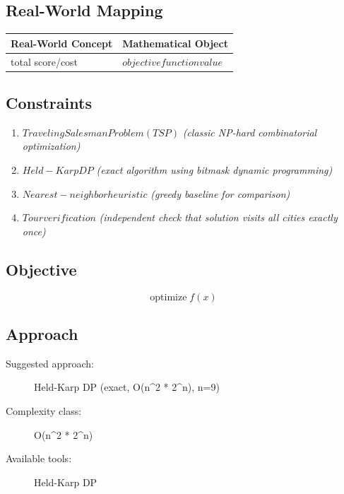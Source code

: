 \documentclass[11pt, a4paper]{article}
\begin{document}
\subsection{Real-World Mapping}

\begin{longtable}{ll}
\toprule
\textbf{Real-World Concept} & \textbf{Mathematical Object} \\
\midrule
\endhead
total score/cost & $objective function value$ \\
\bottomrule
\end{longtable}

\subsection{Constraints}

\begin{enumerate}
  \item $Traveling Salesman Problem (TSP)$
  \hfill \textit{(classic NP-hard combinatorial optimization)}
  \item $Held-Karp DP$
  \hfill \textit{(exact algorithm using bitmask dynamic programming)}
  \item $Nearest-neighbor heuristic$
  \hfill \textit{(greedy baseline for comparison)}
  \item $Tour verification$
  \hfill \textit{(independent check that solution visits all cities exactly once)}
\end{enumerate}

\subsection{Objective}

\begin{equation}
\text{optimize} \; f(x)
\end{equation}

\subsection{Approach}

\begin{description}
  \item[Suggested approach:] Held-Karp DP (exact, O(n\textasciicircum{}2 * 2\textasciicircum{}n), n=9)
  \item[Complexity class:] O(n\textasciicircum{}2 * 2\textasciicircum{}n)
  \item[Available tools:] Held-Karp DP
\end{description}
\end{document}
